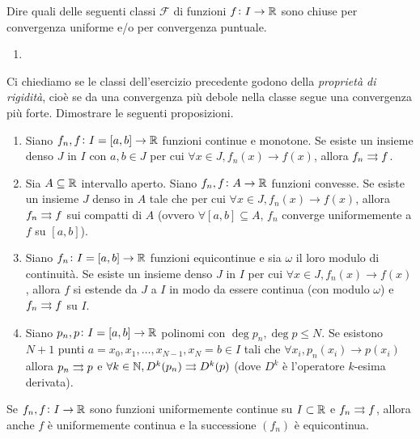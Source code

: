 \begin{es}
  Dire quali delle seguenti classi $ \mathcal{F} $ di funzioni $ f \colon I \to \mathbb{R} $ sono chiuse per convergenza uniforme e/o per convergenza puntuale.
  \begin{enumerate}[label = (\roman*)]
  \item
  \end{enumerate}
\end{es}

\begin{es}
  Ci chiediamo se le classi dell'esercizio precedente godono della \emph{proprietà di rigidità}, cioè se da una convergenza più debole nella classe segue una convergenza più forte. Dimostrare le seguenti proposizioni.
  \begin{enumerate}[label = (\roman*)]
  \item Siano $ f_n, f \colon I = [a, b] \to \mathbb{R} $ funzioni continue e monotone. Se esiste un insieme denso $ J $ in $ I $ con $ a, b \in J $ per cui $ \forall x \in J, f_n(x) \to f(x) $, allora $ f_n \rightrightarrows f $.
  \item Sia $ A \subseteq \mathbb{R} $ intervallo aperto. Siano $ f_n, f \colon A \to \mathbb{R} $ funzioni convesse. Se esiste un insieme $ J $ denso in $ A $ tale che per cui $ \forall x \in J, f_n(x) \to f(x) $, allora $ f_n \rightrightarrows f $ sui compatti di $ A $ (ovvero $ \forall [a, b] \subseteq A $, $ f_n $ converge uniformemente a $ f $ su $ [a, b] $).
  \item Siano $ f_n \colon I = [a, b] \to \mathbb{R} $ funzioni equicontinue e sia $ \omega $ il loro modulo di continuità. Se esiste un insieme denso $ J $ in $ I $ per cui $ \forall x \in J, f_n(x) \to f(x) $, allora $ f $ si estende da $ J $ a $ I $ in modo da essere continua (con modulo $ \omega $) e $ f_n \rightrightarrows f $ su $ I $.
  \item Siano $ p_n, p \colon I = [a, b] \to \mathbb{R} $ polinomi con $ \deg{p_n}, \deg{p} \leq N $. Se esistono $ N + 1 $ punti $ a = x_0, x_1, \ldots, x_{N - 1}, x_N = b \in I $ tali che $ \forall x_i, p_n(x_i) \to p(x_i) $ allora $ p_n \rightrightarrows p $ e $ \forall k \in \mathbb{N}, D^{k}(p_n) \rightrightarrows D^{k}(p) $ (dove $ D^{k} $ è l'operatore $ k $-esima derivata).
  \end{enumerate}
\end{es}
%


\begin{es}
  Se $ f_n, f \colon I \to \mathbb{R} $ sono funzioni uniformemente continue su $ I \subset \mathbb{R} $ e $ f_n \rightrightarrows f $, allora anche $ f $ è uniformemente continua e la successione $ (f_n) $ è equicontinua.
\end{es}
%

